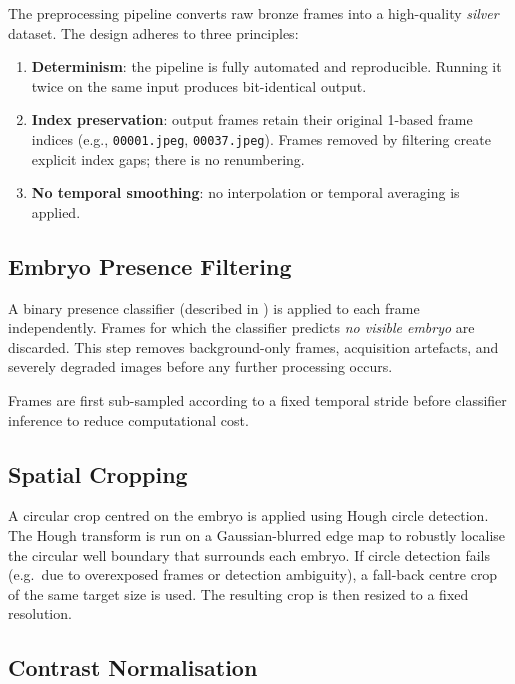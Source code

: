 \documentclass[12pt, a4paper, twoside]{report}
\begin{document}
The preprocessing pipeline converts raw bronze frames into a high-quality
\emph{silver} dataset.
The design adheres to three principles:
\begin{enumerate}
  \item \textbf{Determinism}: the pipeline is fully automated and reproducible.
        Running it twice on the same input produces bit-identical output.
  \item \textbf{Index preservation}: output frames retain their original
        1-based frame indices (e.g., \texttt{00001.jpeg}, \texttt{00037.jpeg}).
        Frames removed by filtering create explicit index gaps; there is no
        renumbering.
  \item \textbf{No temporal smoothing}: no interpolation or temporal
        averaging is applied.
\end{enumerate}

\subsection{Embryo Presence Filtering}
\label{ssec:presence_filtering}

A binary presence classifier (described in ) is
applied to each frame independently.
Frames for which the classifier predicts \emph{no visible embryo} are discarded.
This step removes background-only frames, acquisition artefacts, and severely
degraded images before any further processing occurs.

Frames are first sub-sampled according to a fixed temporal stride before
classifier inference to reduce computational cost.

\subsection{Spatial Cropping}
\label{ssec:cropping}

A circular crop centred on the embryo is applied using Hough circle detection.
The Hough transform is run on a Gaussian-blurred edge map to robustly localise
the circular well boundary that surrounds each embryo.
If circle detection fails (e.g.\ due to overexposed frames or detection
ambiguity), a fall-back centre crop of the same target size is used.
The resulting crop is then resized to a fixed resolution.

\subsection{Contrast Normalisation}
\label{ssec:clahe}
\end{document}
